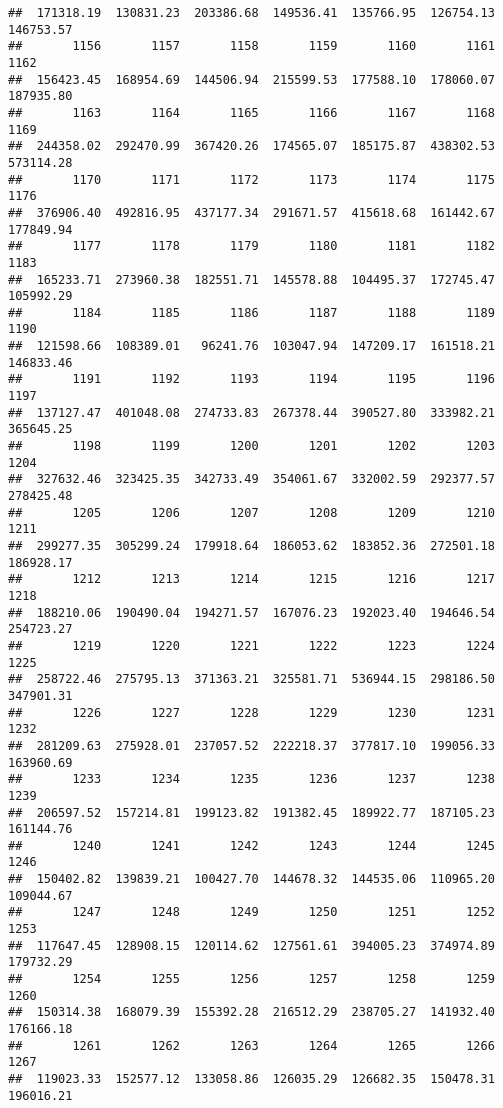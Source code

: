 \documentclass[
]{article}
\begin{document}
\begin{verbatim}
##  171318.19  130831.23  203386.68  149536.41  135766.95  126754.13  146753.57 
##       1156       1157       1158       1159       1160       1161       1162 
##  156423.45  168954.69  144506.94  215599.53  177588.10  178060.07  187935.80 
##       1163       1164       1165       1166       1167       1168       1169 
##  244358.02  292470.99  367420.26  174565.07  185175.87  438302.53  573114.28 
##       1170       1171       1172       1173       1174       1175       1176 
##  376906.40  492816.95  437177.34  291671.57  415618.68  161442.67  177849.94 
##       1177       1178       1179       1180       1181       1182       1183 
##  165233.71  273960.38  182551.71  145578.88  104495.37  172745.47  105992.29 
##       1184       1185       1186       1187       1188       1189       1190 
##  121598.66  108389.01   96241.76  103047.94  147209.17  161518.21  146833.46 
##       1191       1192       1193       1194       1195       1196       1197 
##  137127.47  401048.08  274733.83  267378.44  390527.80  333982.21  365645.25 
##       1198       1199       1200       1201       1202       1203       1204 
##  327632.46  323425.35  342733.49  354061.67  332002.59  292377.57  278425.48 
##       1205       1206       1207       1208       1209       1210       1211 
##  299277.35  305299.24  179918.64  186053.62  183852.36  272501.18  186928.17 
##       1212       1213       1214       1215       1216       1217       1218 
##  188210.06  190490.04  194271.57  167076.23  192023.40  194646.54  254723.27 
##       1219       1220       1221       1222       1223       1224       1225 
##  258722.46  275795.13  371363.21  325581.71  536944.15  298186.50  347901.31 
##       1226       1227       1228       1229       1230       1231       1232 
##  281209.63  275928.01  237057.52  222218.37  377817.10  199056.33  163960.69 
##       1233       1234       1235       1236       1237       1238       1239 
##  206597.52  157214.81  199123.82  191382.45  189922.77  187105.23  161144.76 
##       1240       1241       1242       1243       1244       1245       1246 
##  150402.82  139839.21  100427.70  144678.32  144535.06  110965.20  109044.67 
##       1247       1248       1249       1250       1251       1252       1253 
##  117647.45  128908.15  120114.62  127561.61  394005.23  374974.89  179732.29 
##       1254       1255       1256       1257       1258       1259       1260 
##  150314.38  168079.39  155392.28  216512.29  238705.27  141932.40  176166.18 
##       1261       1262       1263       1264       1265       1266       1267 
##  119023.33  152577.12  133058.86  126035.29  126682.35  150478.31  196016.21 

\end{verbatim}
\end{document}
